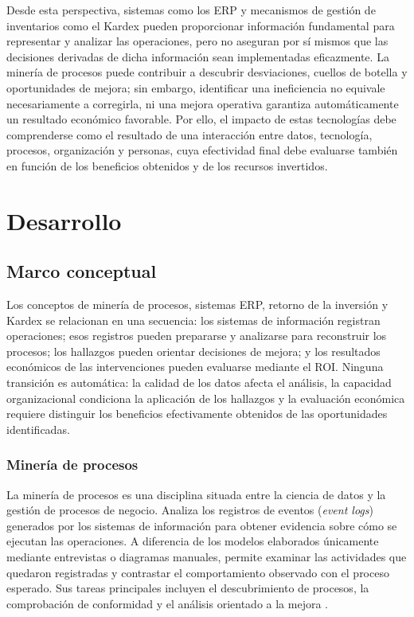 \documentclass{article}
\begin{document}
    Desde esta perspectiva, sistemas como los ERP y mecanismos de gestión de inventarios como el Kardex pueden proporcionar información fundamental para representar y analizar las operaciones, pero no aseguran por sí mismos que las decisiones derivadas de dicha información sean implementadas eficazmente. La minería de procesos puede contribuir a descubrir desviaciones, cuellos de botella y oportunidades de mejora; sin embargo, identificar una ineficiencia no equivale necesariamente a corregirla, ni una mejora operativa garantiza automáticamente un resultado económico favorable. Por ello, el impacto de estas tecnologías debe comprenderse como el resultado de una interacción entre datos, tecnología, procesos, organización y personas, cuya efectividad final debe evaluarse también en función de los beneficios obtenidos y de los recursos invertidos.

    \section{Desarrollo}
    \subsection{Marco conceptual}

    Los conceptos de minería de procesos, sistemas ERP, retorno de la inversión y Kardex se relacionan en una secuencia: los sistemas de información registran operaciones; esos registros pueden prepararse y analizarse para reconstruir los procesos; los hallazgos pueden orientar decisiones de mejora; y los resultados económicos de las intervenciones pueden evaluarse mediante el ROI. Ninguna transición es automática: la calidad de los datos afecta el análisis, la capacidad organizacional condiciona la aplicación de los hallazgos y la evaluación económica requiere distinguir los beneficios efectivamente obtenidos de las oportunidades identificadas.

    \subsubsection{Minería de procesos}

    La minería de procesos es una disciplina situada entre la ciencia de datos y la gestión de procesos de negocio. Analiza los registros de eventos (\textit{event logs}) generados por los sistemas de información para obtener evidencia sobre cómo se ejecutan las operaciones. A diferencia de los modelos elaborados únicamente mediante entrevistas o diagramas manuales, permite examinar las actividades que quedaron registradas y contrastar el comportamiento observado con el proceso esperado. Sus tareas principales incluyen el descubrimiento de procesos, la comprobación de conformidad y el análisis orientado a la mejora \cite{marin-castro2021preprocessing}.
\end{document}
